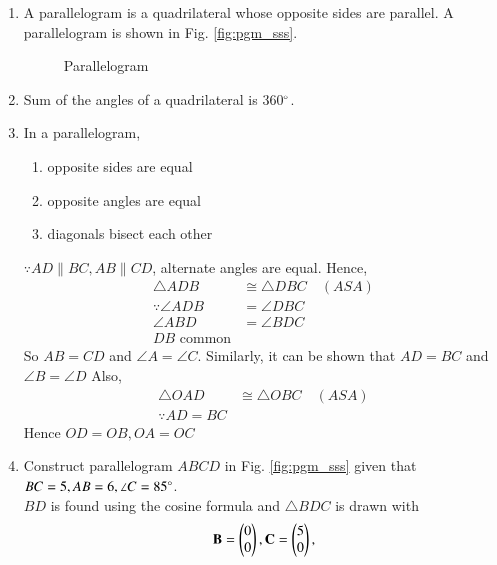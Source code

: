 \renewcommand{\theequation}{\theenumi}
\begin{enumerate}[label=\arabic*.,ref=\thesubsection.\theenumi]
\item A parallelogram is a quadrilateral whose opposite sides are parallel. A parallelogram is shown in Fig. \eqref{fig:pgm_sss}.	

%
\begin{figure}[!ht]
	\begin{center}
		\resizebox{\columnwidth}{!}{}
	\end{center}
	\caption{Parallelogram}
	\label{fig:pgm_sas}	
\end{figure}

\item Sum of the angles of a quadrilateral is 360$\degree$. 
\item  In a parallelogram, 
\label{them:pgm_basic}
\begin{enumerate}
\item opposite sides are equal 
\item  opposite angles are equal
\item  diagonals bisect each other
\end{enumerate}
\solution $\because AD \parallel BC, AB \parallel CD$, alternate angles are equal.  Hence, 
%
\begin{align}
\triangle ADB &\cong \triangle  DBC \quad (ASA)
\\
\because \angle ADB &= \angle DBC
\\
\angle ABD &= \angle BDC
\\
DB \text{ common}
\end{align}
%
So $AB = CD$ and $\angle A = \angle C$.  Similarly, it can be shown that $AD = BC$ and $\angle B = \angle D$
Also, 
%
\begin{align}
\triangle OAD &\cong \triangle  OBC \quad (ASA)
\\
\because AD = BC
\end{align}
%
Hence $OD = OB, OA=OC$
\item Construct parallelogram $ABCD$ 	in Fig. \ref{fig:pgm_sss}	
given that  $BC = 5, AB = 6, \angle C = 85 \degree$.
\\
\solution $BD$ is found using the cosine formula and $\triangle BDC$ is drawn with 
%
\begin{align}
\mathbf{B} = \begin{pmatrix}0\\0\end{pmatrix},
\mathbf{C} = \begin{pmatrix}5\\0\end{pmatrix},
\end{align}

\end{enumerate}
